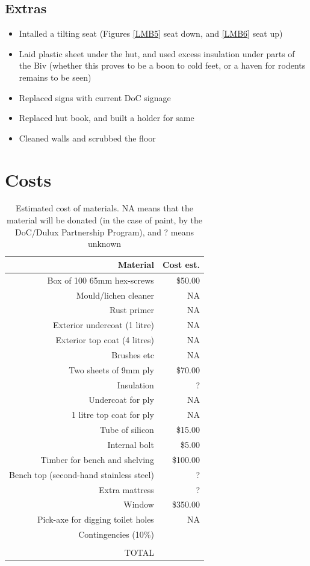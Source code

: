 \documentclass[12pt]{article} %
\begin{document}
\subsection{Extras}

\begin{itemize}
 \item Intalled a tilting seat (Figures \ref{LMB5} seat down, and \ref{LMB6} seat up)
 \item Laid plastic sheet under the hut, and used excess insulation under parts of the Biv (whether this proves to be a boon to cold feet, or a haven for rodents remains to be seen)
 \item Replaced signs with current DoC signage
 \item Replaced hut book, and built a holder for same
 \item Cleaned walls and scrubbed the floor
\end{itemize}

\section{Costs}

\begin{table}[ht]
\caption{Estimated cost of materials.  NA means that the material will be donated (in the case of paint, by the DoC/Dulux Partnership Program), and ? means unknown} %
\label{costs}
\centering %
\begin{tabular}{rr}
\hline
Material & Cost est. \\ [0.5ex]
\hline %
Box of 100 65mm hex-screws & \$50.00\\
Mould/lichen cleaner & NA\\
Rust primer & NA\\
Exterior undercoat (1 litre) & NA\\
Exterior top coat (4 litres) & NA\\
Brushes etc & NA\\
Two sheets of 9mm ply & \$70.00 \\
Insulation & ?\\
Undercoat for ply & NA \\
1 litre top coat for ply & NA \\
Tube of silicon & \$15.00 \\
Internal bolt & \$5.00 \\
Timber for bench and shelving & \$100.00 \\
Bench top (second-hand stainless steel) & ?\\
Extra mattress & ?\\
Window & \$350.00 \\
Pick-axe for digging toilet holes & NA \\
Contingencies (10\%) & \\ [1ex] %
\hline \\
TOTAL & \\
\hline \hline %
\end{tabular}
\label{costs} %
\end{table}
\end{document}
